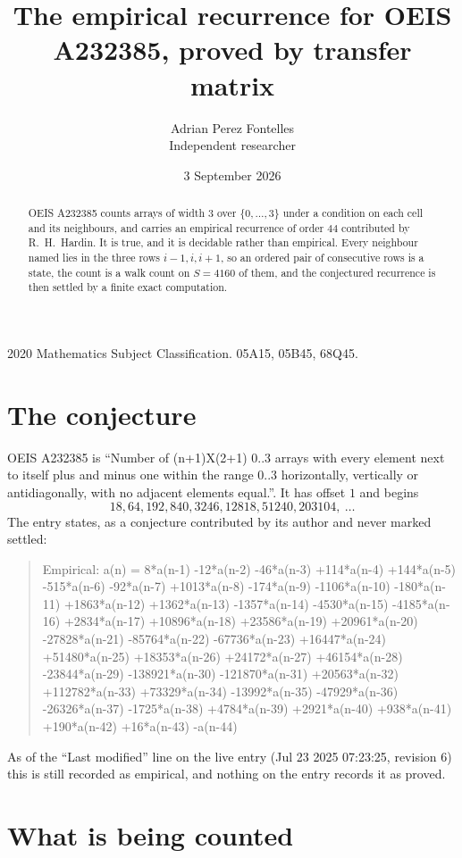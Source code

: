 \documentclass[11pt,a4paper]{article}
\title{The empirical recurrence for OEIS A232385, proved by transfer matrix}
\author{Adrian Perez Fontelles\\ \small Independent researcher}
\date{3 September 2026}
\theoremstyle{plain}
\theoremstyle{definition}
\begin{document}
\maketitle

\begin{abstract}
OEIS A232385 counts arrays of width $3$ over $\{0,\dots,3\}$ under a condition on each cell
and its neighbours, and carries an empirical recurrence of order $44$ contributed by
R.~H.~Hardin. It is true, and it is decidable rather than empirical. Every neighbour named lies
in the three rows $i-1,i,i+1$, so an ordered pair of consecutive rows is a state, the count is
a walk count on $S=4160$ of them, and the conjectured recurrence is then settled by a finite
exact computation.
\end{abstract}

\noindent\small 2020 Mathematics Subject Classification. 05A15, 05B45, 68Q45.\normalsize

\section{The conjecture}

OEIS A232385 is ``Number of (n+1)X(2+1) 0..3 arrays with every element next to itself plus and minus one within the range 0..3 horizontally, vertically or antidiagonally, with no adjacent elements equal.''. It has offset $1$ and begins
\[
18, 64, 192, 840, 3246, 12818, 51240, 203104,\ \dots
\]
The entry states, as a conjecture contributed by its author and never marked settled:
\begin{quote}
Empirical: a(n) = 8*a(n-1) -12*a(n-2) -46*a(n-3) +114*a(n-4) +144*a(n-5) -515*a(n-6) -92*a(n-7) +1013*a(n-8) -174*a(n-9) -1106*a(n-10) -180*a(n-11) +1863*a(n-12) +1362*a(n-13) -1357*a(n-14) -4530*a(n-15) -4185*a(n-16) +2834*a(n-17) +10896*a(n-18) +23586*a(n-19) +20961*a(n-20) -27828*a(n-21) -85764*a(n-22) -67736*a(n-23) +16447*a(n-24) +51480*a(n-25) +18353*a(n-26) +24172*a(n-27) +46154*a(n-28) -23844*a(n-29) -138921*a(n-30) -121870*a(n-31) +20563*a(n-32) +112782*a(n-33) +73329*a(n-34) -13992*a(n-35) -47929*a(n-36) -26326*a(n-37) -1725*a(n-38) +4784*a(n-39) +2921*a(n-40) +938*a(n-41) +190*a(n-42) +16*a(n-43) -a(n-44)
\end{quote}
As of the ``Last modified'' line on the live entry (Jul 23 2025 07:23:25, revision 6) this is still
recorded as empirical, and nothing on the entry records it as proved.

\section{What is being counted}
\end{document}
